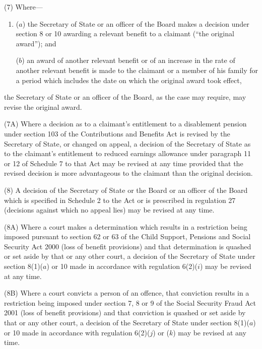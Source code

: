 \documentclass[12pt,a4paper]{article}
\begin{document}
(7) Where—
\begin{enumerate}\item[]
($a$) the Secretary of State or an officer of the Board makes a decision under section 8 or 10 awarding a relevant benefit to a claimant (“the original award”); and

($b$) an award of another relevant benefit or of an increase in the rate of another relevant benefit is made to the claimant or a member of his family for a period which includes the date on which the original award took effect,
\end{enumerate}
the Secretary of State or an officer of the Board, as the case may require, may revise the original award.

(7A) Where a decision as to a claimant’s entitlement to a disablement pension under section 103 of the Contributions and Benefits Act is revised by the Secretary of State, or changed on appeal, a decision of the Secretary of State as to the claimant’s entitlement to reduced earnings allowance under paragraph 11 or 12 of Schedule 7 to that Act may be revised at any time provided that the revised decision is more advantageous to the claimant than the original decision.

(8) A decision of the Secretary of State 
or the Board or an officer of the Board  %
which is specified in Schedule 2 to the Act or is prescribed in regulation 27 (decisions against which no appeal lies) may be revised at any time.

(8A) Where a court makes a determination which results in a restriction being imposed pursuant to section 62 or 63 of the Child Support, Pensions and Social Security Act 2000 (loss of benefit provisions) and that determination is quashed or set aside by that or any other court, a decision of the Secretary of State under section 8(1)($a$)  or 10 made in accordance with regulation 6(2)($i$) may be revised at any time.

(8B) Where a court convicts a person of an offence, that conviction results in a restriction being imposed under section 7, 8 or 9 of the Social Security Fraud Act 2001 (loss of benefit provisions) and that conviction is quashed or set aside by that or any other court, a decision of the Secretary of State under section 8(1)($a$)  or 10 made in accordance with regulation 6(2)($j$)  or ($k$)  may be revised at any time.
\end{document}
